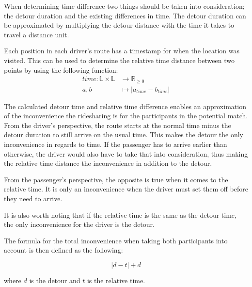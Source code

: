 When determining time difference two things should be taken into consideration; the detour duration and the existing differences in time.
The detour duration can be approximated by multiplying the detour distance with the time it takes to travel a distance unit.

Each position in each driver's route has a timestamp for when the location was visited.
This can be used to determine the relative time distance between two points by using the following function:
\begin{align*}
	time : \mathbb{L}\times\mathbb{L} &\rightarrow \mathbb{R}_{\geq 0}\\
	a, b &\mapsto | a_{time} - b_{time} |
\end{align*}

The calculated detour time and relative time difference enables an approximation of the inconvenience the ridesharing is for the participants in the potential match.
From the driver's perspective, the route starts at the normal time minus the detour duration to still arrive on the usual time.
This makes the detour the only inconvenience in regards to time.
If the passenger has to arrive earlier than otherwise, the driver would also have to take that into consideration, thus making the relative time distance the inconvenience in addition to the detour.

From the passenger's perspective, the opposite is true when it comes to the relative time. 
It is only an inconvenience when the driver must set them off before they need to arrive.

It is also worth noting that if the relative time is the same as the detour time, the only inconvenience for the driver is the detour.

The formula for the total inconvenience when taking both participants into account is then defined as the following:

\[ |d - t| + d \]

where $d$ is the detour and $t$ is the relative time.

\iffalse
Now, let us consider what would happen on the return route.
The situation is now that the driver and passenger want to return to their original locations, but they want to leave at a specific time.
The algorithm already solves this because if a specific arrival time is defined a specific departure time must also be defined.
And the differences in time must be the same.
\fi

